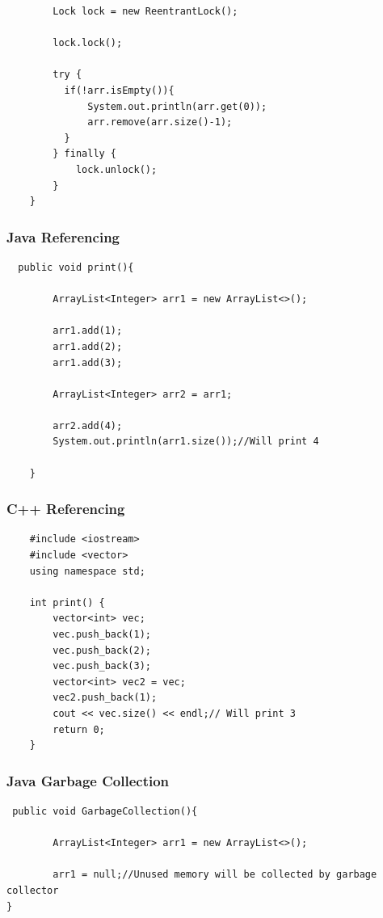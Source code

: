 \documentclass[10pt]{article}  %
\theoremstyle{definition}
\theoremstyle{remark}
\begin{document}
\begin{appendices}
\begin{lstlisting}
        Lock lock = new ReentrantLock();

        lock.lock();

        try {
          if(!arr.isEmpty()){
              System.out.println(arr.get(0));
              arr.remove(arr.size()-1);
          }
        } finally {
            lock.unlock();
        }
    }
\end{lstlisting}



\subsubsection{Java Referencing}\label{refExp} 
\begin{lstlisting}
  public void print(){

        ArrayList<Integer> arr1 = new ArrayList<>();

        arr1.add(1);
        arr1.add(2);
        arr1.add(3);

        ArrayList<Integer> arr2 = arr1;

        arr2.add(4);
        System.out.println(arr1.size());//Will print 4

    }
\end{lstlisting} 



\subsubsection{C++ Referencing}\label{refExp2} 
\begin{lstlisting}
    #include <iostream>
    #include <vector>
    using namespace std;
     
    int print() {
    	vector<int> vec; 
    	vec.push_back(1);
    	vec.push_back(2);
    	vec.push_back(3);
    	vector<int> vec2 = vec; 
    	vec2.push_back(1);
    	cout << vec.size() << endl;// Will print 3
       	return 0;
    }
\end{lstlisting} 



\subsubsection{Java Garbage Collection}\label{gc}
\begin{lstlisting}
 public void GarbageCollection(){

        ArrayList<Integer> arr1 = new ArrayList<>();
        
        arr1 = null;//Unused memory will be collected by garbage collector
}
\end{lstlisting} 




\end{appendices}
\end{document}
